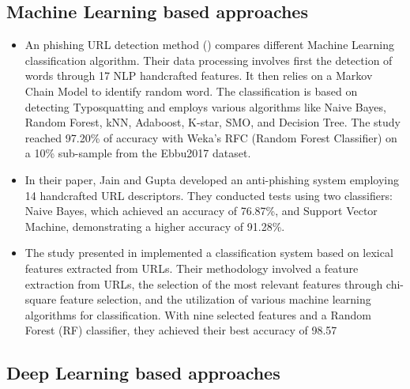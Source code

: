 \documentclass{article}
\begin{document}
    \subsection{Machine Learning based approaches}\label{subsec:machine-learning-based-approaches}

    \begin{itemize}

        \item An phishing URL detection method (\cite{PhishingURLDetection}) compares different Machine Learning classification algorithm.
        Their data processing involves first the detection of words through 17 NLP handcrafted features.
        It then relies on a Markov Chain Model to identify random word.
        The classification is based on detecting Typosquatting and employs various algorithms like Naive Bayes, Random Forest, kNN, Adaboost, K-star, SMO, and Decision Tree.
        The study reached 97.20\% of accuracy with Weka's RFC (Random Forest Classifier) on a 10\% sub-sample from the Ebbu2017 dataset.

        \item In their paper\cite{PhishSafe}, Jain and Gupta developed an anti-phishing system employing 14 handcrafted URL descriptors.
        They conducted tests using two classifiers: Naive Bayes, which achieved an accuracy of 76.87\%, and Support Vector Machine, demonstrating a higher accuracy of 91.28\%.

        \item The study presented in\cite{LexicalFeatureSelection} implemented a classification system based on lexical features extracted from URLs. Their methodology involved a feature extraction from URLs, the selection of the most relevant features through chi-square feature selection, and the utilization of various machine learning algorithms for classification.
        With nine selected features and a Random Forest (RF) classifier, they achieved their best accuracy of 98.57%

    \end{itemize}

    \subsection{Deep Learning based approaches}\label{subsec:deep-learning-based-approaches}
\end{document}
